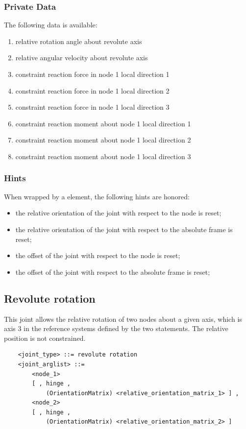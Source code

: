 \subsubsection{Private Data}
The following data is available:
\begin{enumerate}
\item {} relative rotation angle about revolute axis
\item {} relative angular velocity about revolute axis
\item {} constraint reaction force in node 1 local direction 1
\item {} constraint reaction force in node 1 local direction 2
\item {} constraint reaction force in node 1 local direction 3
\item {} constraint reaction moment about node 1 local direction 1
\item {} constraint reaction moment about node 1 local direction 2
\item {} constraint reaction moment about node 1 local direction 3
\end{enumerate}

\subsubsection{Hints}
When wrapped by a  element, the following hints are honored:
\begin{itemize}
\item {} the relative orientation of the joint
with respect to the node is reset;
\item {} the relative orientation of the joint
with respect to the absolute frame is reset;
\item {} the offset of the joint
with respect to the node is reset;
\item {} the offset of the joint
with respect to the absolute frame is reset;
\end{itemize}






\subsection{Revolute rotation}
\label{sec:EL:STRUCT:JOINT:REVOLUTE_ROTATION}
This joint allows the relative rotation of two nodes about
a given axis, which is axis 3 in the reference systems defined 
by the two  statements.
The relative position is not constrained.
\begin{verbatim}
    <joint_type> ::= revolute rotation
    <joint_arglist> ::= 
        <node_1>
        [ , hinge , 
            (OrientationMatrix) <relative_orientation_matrix_1> ] ,
        <node_2>
        [ , hinge , 
            (OrientationMatrix) <relative_orientation_matrix_2> ]
\end{verbatim}

